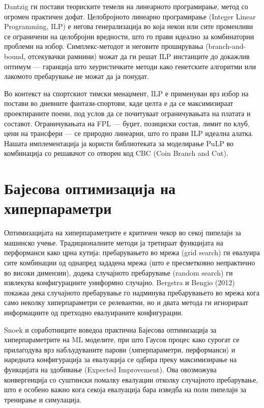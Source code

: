 Dantzig \cite{dantzig1963linear_programming} ги постави теориските темели на линеарното програмирање, метод со огромен практичен дофат. Целобројното линеарно програмирање (Integer Linear Programming, ILP) е негова генерализација во која некои или сите променливи се ограничени на целобројни вредности, што го прави идеално за комбинаторни проблеми на избор. Симплекс-методот и неговите проширувања (branch-and-bound, отсекувачки рамнини) можат да ги решат ILP инстанците до докажлив оптимум — гаранција што хеуристичките методи како генетските алгоритми или лакомото пребарување не можат да ја понудат.

Во контекст на спортскиот тимски менаџмент, ILP е применуван врз избор на постави во дневните фантази-спортови, каде целта е да се максимизираат проектираните поени, под услов да се почитуваат ограничувањата на платата и составот. Ограничувањата на FPL — буџет, позициски состав, лимит по клуб, цени на трансфери — се природно линеарни, што го прави ILP идеална алатка. Нашата имплементација ја користи библиотеката за моделирање PuLP \cite{mitchell2011pulp} во комбинација со решавачот со отворен код CBC (Coin Branch and Cut).

\section{Бајесова оптимизација на хиперпараметри}

Оптимизацијата на хиперпараметрите е критичен чекор во секој пипелајн за машинско учење. Традиционалните методи ја третираат функцијата на перформанси како црна кутија: пребарувањето во мрежа (grid search) ги евалуира сите комбинации од однапред зададена мрежа (што е пресметковно непрактично во високи димензии), додека случајното пребарување (random search) ги извлекува конфигурациите униформно случајно. Bergstra и Bengio (2012) покажаа дека случајното пребарување го надминува пребарувањето во мрежа кога само неколку хиперпараметри се релевантни, но и двата метода ги игнорираат информациите од претходно евалуираните конфигурации.

Snoek и соработниците \cite{snoek2012practical} воведоа практична Бајесова оптимизација за хиперпараметрите на ML моделите, при што Гаусов процес како сурогат се прилагодува врз набљудуваните парови (хиперпараметри, перформанси) и наредната конфигурација за евалуација се одбира преку максимизирање на функцијата на здобивање (Expected Improvement). Ова овозможува конвергенција со суштински помалку евалуации отколку случајното пребарување, што е особено важно кога секоја евалуација бара изведба на полн пипелајн за тренирање и симулација.

